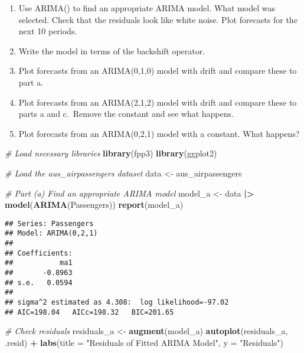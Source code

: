 \documentclass[
]{article}
\newenvironment{Shaded}{\begin{snugshade}}{\end{snugshade}}
\newcommand{\AttributeTok}[1]{\textcolor[rgb]{0.13,0.29,0.53}{#1}}
\newcommand{\CommentTok}[1]{\textcolor[rgb]{0.56,0.35,0.01}{\textit{#1}}}
\newcommand{\FunctionTok}[1]{\textcolor[rgb]{0.13,0.29,0.53}{\textbf{#1}}}
\newcommand{\NormalTok}[1]{#1}
\newcommand{\OtherTok}[1]{\textcolor[rgb]{0.56,0.35,0.01}{#1}}
\newcommand{\SpecialCharTok}[1]{\textcolor[rgb]{0.81,0.36,0.00}{\textbf{#1}}}
\newcommand{\StringTok}[1]{\textcolor[rgb]{0.31,0.60,0.02}{#1}}
\providecommand{\tightlist}{%
  \setlength{\itemsep}{0pt}\setlength{\parskip}{0pt}}
\begin{document}
\begin{enumerate}
\def\labelenumi{\alph{enumi}.}
\tightlist
\item
  Use ARIMA() to find an appropriate ARIMA model. What model was
  selected. Check that the residuals look like white noise. Plot
  forecasts for the next 10 periods.
\item
  Write the model in terms of the backshift operator.
\item
  Plot forecasts from an ARIMA(0,1,0) model with drift and compare these
  to part a.
\item
  Plot forecasts from an ARIMA(2,1,2) model with drift and compare these
  to parts a and c.~Remove the constant and see what happens.
\item
  Plot forecasts from an ARIMA(0,2,1) model with a constant. What
  happens?
\end{enumerate}

\begin{Shaded}
\begin{Highlighting}[]
\CommentTok{\# Load necessary libraries}
\FunctionTok{library}\NormalTok{(fpp3)}
\FunctionTok{library}\NormalTok{(ggplot2)}

\CommentTok{\# Load the aus\_airpassengers dataset}
\NormalTok{data }\OtherTok{\textless{}{-}}\NormalTok{ aus\_airpassengers}

\CommentTok{\# Part (a) Find an appropriate ARIMA model}
\NormalTok{model\_a }\OtherTok{\textless{}{-}}\NormalTok{ data }\SpecialCharTok{|\textgreater{}} \FunctionTok{model}\NormalTok{(}\FunctionTok{ARIMA}\NormalTok{(Passengers))}
\FunctionTok{report}\NormalTok{(model\_a)}
\end{Highlighting}
\end{Shaded}

\begin{verbatim}
## Series: Passengers 
## Model: ARIMA(0,2,1) 
## 
## Coefficients:
##           ma1
##       -0.8963
## s.e.   0.0594
## 
## sigma^2 estimated as 4.308:  log likelihood=-97.02
## AIC=198.04   AICc=198.32   BIC=201.65
\end{verbatim}

\begin{Shaded}
\begin{Highlighting}[]
\CommentTok{\# Check residuals}
\NormalTok{residuals\_a }\OtherTok{\textless{}{-}} \FunctionTok{augment}\NormalTok{(model\_a)}
\FunctionTok{autoplot}\NormalTok{(residuals\_a, .resid) }\SpecialCharTok{+}
  \FunctionTok{labs}\NormalTok{(}\AttributeTok{title =} \StringTok{"Residuals of Fitted ARIMA Model"}\NormalTok{, }\AttributeTok{y =} \StringTok{"Residuals"}\NormalTok{)}
\end{Highlighting}
\end{Shaded}
\end{document}
